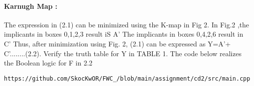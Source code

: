 \documentclass[10pt, a4paper]{article}
\begin{document}
    \paragraph{Karnugh Map :}
The expression in (2.1) can be minimized using the K-map in Fig 2. In Fig.2 ,the implicants in boxes 0,1,2,3 result iS A'
The implicants in boxes 0,4,2,6 result in C'
Thus, after minimization using Fig. 2, (2.1) can
be expressed as
Y=A'+ C'........(2.2).
Verify the truth table for Y in TABLE 1.
The code below realizes the Boolean logic for F in 2.2
\begin{lstlisting}
https://github.com/SkocKwOR/FWC_/blob/main/assignment/cd2/src/main.cpp
\end{lstlisting}

\end{document}
